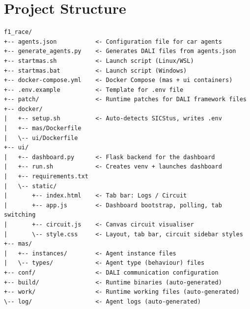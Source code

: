 \section{Project Structure}

\begin{lstlisting}[language={}, numbers=none, frame=none, backgroundcolor=\color{white},basicstyle=\ttfamily\scriptsize]
f1_race/
+-- agents.json           <- Configuration file for car agents
+-- generate_agents.py    <- Generates DALI files from agents.json
+-- startmas.sh           <- Launch script (Linux/WSL)
+-- startmas.bat          <- Launch script (Windows)
+-- docker-compose.yml    <- Docker Compose (mas + ui containers)
+-- .env.example          <- Template for .env file
+-- patch/                <- Runtime patches for DALI framework files
+-- docker/
|   +-- setup.sh          <- Auto-detects SICStus, writes .env
|   +-- mas/Dockerfile
|   \-- ui/Dockerfile
+-- ui/
|   +-- dashboard.py      <- Flask backend for the dashboard
|   +-- run.sh            <- Creates venv + launches dashboard
|   +-- requirements.txt
|   \-- static/
|       +-- index.html    <- Tab bar: Logs / Circuit
|       +-- app.js        <- Dashboard bootstrap, polling, tab switching
|       +-- circuit.js    <- Canvas circuit visualiser
|       \-- style.css     <- Layout, tab bar, circuit sidebar styles
+-- mas/
|   +-- instances/        <- Agent instance files
|   \-- types/            <- Agent type (behaviour) files
+-- conf/                 <- DALI communication configuration
+-- build/                <- Runtime binaries (auto-generated)
+-- work/                 <- Runtime working files (auto-generated)
\-- log/                  <- Agent logs (auto-generated)
\end{lstlisting}
